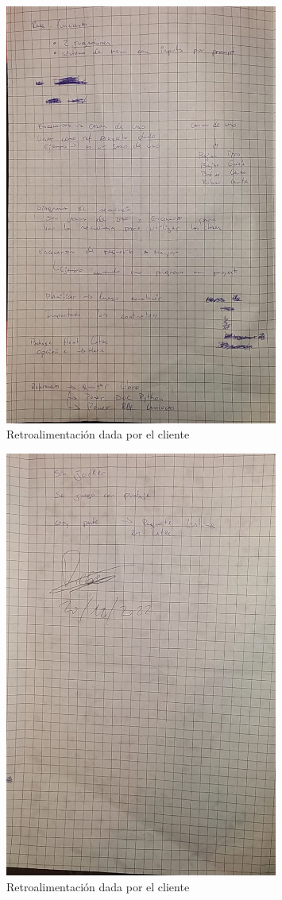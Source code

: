 \begin{figure}[H]
    \centering
    \includegraphics[width=0.8\textwidth]{imagenes/retroalimentacion2.jpg}
    \caption{Retroalimentación dada por el cliente}
    \label{fig:retroalimentacion}
\end{figure}

\begin{figure}[H]
    \centering
    \includegraphics[width=0.8\textwidth]{imagenes/retroalimentacion3.jpg}
    \caption{Retroalimentación dada por el cliente}
    \label{fig:retroalimentacion}
\end{figure}

